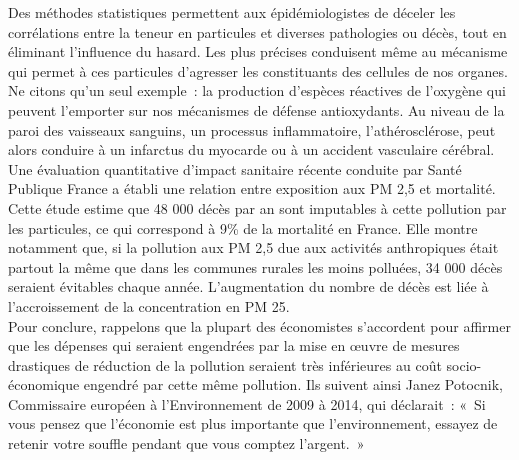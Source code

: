 \documentclass[8pt]{article}
\begin{document}
Des méthodes statistiques permettent aux épidémiologistes de déceler les corrélations entre la teneur en particules et diverses pathologies ou décès, tout en éliminant l’influence du hasard. Les plus précises conduisent même au mécanisme qui permet à ces particules d’agresser les constituants des cellules de nos organes. Ne citons qu’un seul exemple~: la production d’espèces réactives de l’oxygène qui peuvent l’emporter sur nos mécanismes de défense antioxydants. Au niveau de la paroi des vaisseaux sanguins, un processus inflammatoire, l’athérosclérose, peut alors conduire à un infarctus du myocarde ou à un accident vasculaire cérébral.
Une évaluation quantitative d’impact sanitaire récente conduite par Santé Publique France a établi une relation entre exposition aux PM 2,5 et mortalité.
Cette étude estime que 48 000 décès par an sont imputables à cette pollution par les particules, ce qui correspond à 9\% de la mortalité en France. Elle montre notamment que, si la pollution aux PM 2,5 due aux activités anthropiques était partout la même que dans les communes rurales les moins polluées, 34 000 décès seraient évitables chaque année.
L’augmentation du nombre de décès est liée à l’accroissement de la concentration en PM 25.\\

Pour conclure, rappelons que la plupart des économistes s’accordent pour affirmer que les dépenses qui seraient engendrées par la mise en œuvre de mesures drastiques de réduction de la pollution seraient très inférieures au coût socio-économique engendré par cette même pollution. Ils suivent ainsi Janez Potocnik, Commissaire européen à l’Environnement de 2009 à 2014, qui déclarait~:
«~Si vous pensez que l’économie est plus importante que l’environnement, essayez de retenir votre souffle pendant que vous comptez l’argent.~»
\end{document}
